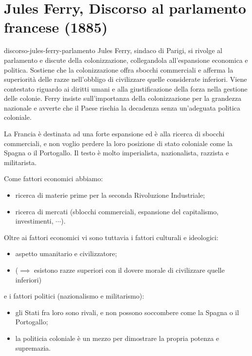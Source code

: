 \documentclass[preview]{standalone}
\begin{document}
\section{Jules Ferry, Discorso al parlamento francese (1885)}

\begin{snippet}{discorso-jules-ferry-parlamento}
    Jules Ferry, sindaco di Parigi, si rivolge al parlamento e
    discute della colonizzazione, collegandola all'espansione economica e politica.
    Sostiene che la colonizzazione offra sbocchi commerciali e afferma la superiorità delle razze
    nell'obbligo di civilizzare quelle considerate inferiori.
    Viene contestato riguardo ai diritti umani e alla giustificazione della forza nella
    gestione delle colonie.
    Ferry insiste sull'importanza della colonizzazione per la grandezza nazionale e
    avverte che il Paese rischia la decadenza senza un'adeguata politica coloniale.
    
    La Francia è destinata ad una forte espansione ed è alla ricerca di sbocchi commerciali,
    e non voglio perdere la loro posizione di stato coloniale come la Spagna o il Portogallo.
    Il testo è molto imperialista, nazionalista, razzista e militarista.
    
    Come fattori economici abbiamo:
    \begin{itemize}
        \item ricerca di materie prime per la seconda Rivoluzione Industriale;
        \item ricerca di mercati (sblocchi commerciali, espansione del capitalismo, investimenti, \(\cdots\)).
    \end{itemize}
    Oltre ai fattori economici vi sono tuttavia i fattori culturali e ideologici:
    \begin{itemize}
        \item aspetto umanitario e civilizzatore;
        \item (\(\implies\) esistono razze superiori con il dovere morale di civilizzare quelle inferiori)
    \end{itemize}
    e i fattori politici (nazionalismo e militarismo):
    \begin{itemize}
        \item gli Stati fra loro sono rivali, e non possono soccombere come la Spagna o il Portogallo;
        \item la politicia coloniale è un mezzo per dimostrare la propria potenza e supremazia.
    \end{itemize}
\end{snippet}
\end{document}
